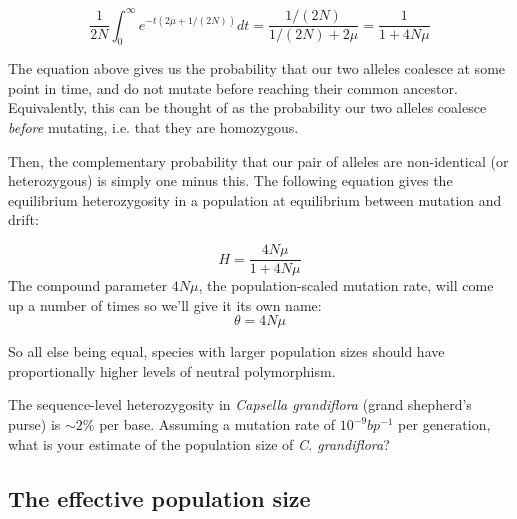 \begin{equation}
\frac{1}{2N} \int_0^{\infty} e^{-t(2\mu+1/(2N))} dt =
\frac{1/(2N)}{1/(2N)+2\mu} = \frac{1}{1+4N\mu}
\end{equation}

The equation above gives us the probability that our two alleles coalesce at some point
in time, and do not mutate before reaching their common
ancestor. Equivalently, this can be thought of as the probability our two
alleles coalesce \emph{before} mutating, i.e. that they are homozygous.

Then, the complementary probability that our pair of alleles are non-identical
(or heterozygous) is simply one minus this. The following equation gives the equilibrium
heterozygosity in a population at equilibrium between mutation and drift:


\begin{equation}
  H = \frac{4N\mu}{1+4N\mu} \label{eqn:hetero}
\end{equation}
 The compound parameter $4N\mu$, the population-scaled mutation rate,
will come up a number of times so we'll give it its own name:
\begin{equation}
\theta = 4N\mu
\end{equation}

So all else being equal, species with larger population sizes should
have proportionally higher levels of neutral polymorphism.

\begin{question}
The sequence-level heterozygosity in {\it Capsella grandiflora} (grand shepherd's purse) is $\sim 2\%$ per base. Assuming a mutation rate of $10^{-9} bp^{-1}$ per generation, what is your estimate of the population size of {\it C. grandiflora}?
\end{question}

\subsection{The effective population size}

